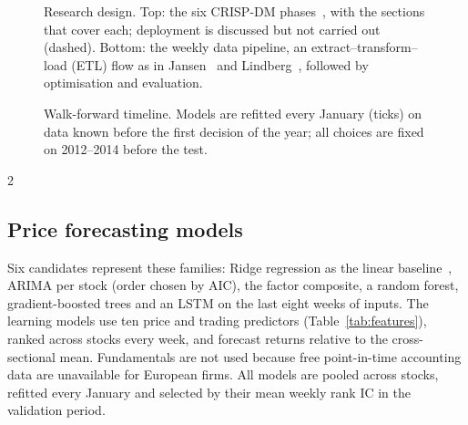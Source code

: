 \begin{figure}[H]
\caption{Research design. Top: the six CRISP-DM phases~\cite{chapman}, with the sections that cover each; deployment is discussed but not carried out (dashed). Bottom: the weekly data pipeline, an extract--transform--load (ETL) flow as in Jansen~\cite[ch.~14]{jansen} and Lindberg~\cite{lindberg}, followed by optimisation and evaluation.}\label{fig:design}
\end{figure}
\begin{figure}[tp]\centering
{}
\caption{Walk-forward timeline. Models are refitted every January (ticks) on data known before the first decision of the year; all choices are fixed on 2012--2014 before the test.}\label{fig:timeline}
\end{figure}
\begin{multicols}{2}

\subsection{Price forecasting models}
Six candidates represent these families: Ridge regression as the linear baseline~\cite{hoerl}, ARIMA per stock (order chosen by AIC), the factor composite, a random forest, gradient-boosted trees and an LSTM on the last eight weeks of inputs. The learning models use ten price and trading predictors (Table~\ref{tab:features}), ranked across stocks every week, and forecast returns relative to the cross-sectional mean. Fundamentals are not used because free point-in-time accounting data are unavailable for European firms. All models are pooled across stocks, refitted every January and selected by their mean weekly rank IC in the validation period.
\end{multicols}
